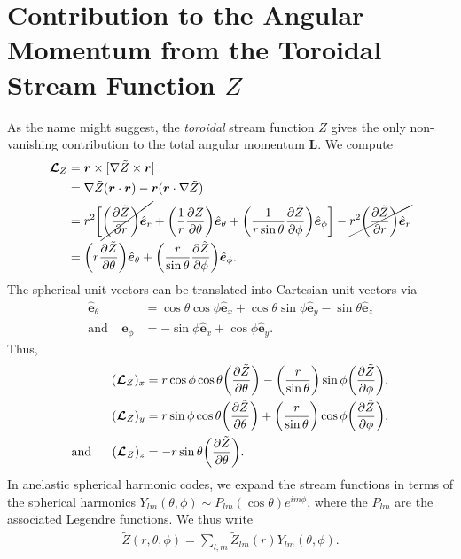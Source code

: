 \documentclass[12pt]{article} %
\newcommand{\pderiv}[2]{\frac{\partial#1}{\partial#2}}
\newcommand{\andd}{\text{and}\ \ \ \ \ }
\newcommand{\tz}{\tilde{Z}}
\newcommand{\e}{\hat{\bm{e}}}
\begin{document}
\section{Contribution to the Angular Momentum from the Toroidal Stream Function $Z$}
As the name might suggest, the \textit{toroidal} stream function $Z$ gives the only non-vanishing contribution to the total angular momentum $\bm{L}$. We compute 
\begin{align*}
\bm{\mathcal{L}}_Z &= \bm{r}\times[\nabla\tz\times\bm{r}]\\
&= \nabla\tz(\bm{r}\cdot\bm{r}) - \bm{r}(\bm{r}\cdot\nabla\tz)\\
&= r^2\bigg{[}\cancel{\bigg{(}\pderiv{\tz}{r}\bigg{)}\e_r}+\bigg{(}\frac{1}{r}\pderiv{\tz}{\theta}\bigg{)}\e_\theta + \bigg{(}\frac{1}{r\sin\theta}\pderiv{\tz}{\phi}\bigg{)}\e_\phi\bigg{]} - \cancel{r^2\bigg{(}\pderiv{\tz}{r}\bigg{)}\e_r}\\
&= \bigg{(}r\pderiv{\tz}{\theta}\bigg{)}\e_\theta + \bigg{(}\frac{r}{\sin\theta}\pderiv{\tz}{\phi}\bigg{)}\e_\phi.
\end{align*}
The spherical unit vectors can be translated into Cartesian unit vectors via
\begin{align*}
\e_\theta &= \cos\theta\cos\phi\e_x + \cos\theta\sin{\phi}\e_y - \sin\theta\e_z\\
\andd \e_\phi &= -\sin\phi\e_x + \cos\phi\e_y.
\end{align*}
Thus, 
\begin{subequations}\label{eq:lxyz}
	\begin{align}
(\bm{\mathcal{L}}_Z)_x &= r\cos\phi\cos\theta \bigg{(}\pderiv{\tz}{\theta}\bigg{)} - \bigg{(}\frac{r}{\sin\theta}\bigg{)}\sin\phi\bigg{(} \pderiv{\tz}{\phi}\bigg{)},\\
(\bm{\mathcal{L}}_Z)_y &= r\sin\phi\cos\theta \bigg{(}\pderiv{\tz}{\theta}\bigg{)} + \bigg{(}\frac{r}{\sin\theta}\bigg{)}\cos\phi\bigg{(} \pderiv{\tz}{\phi}\bigg{)},\\
\andd(\bm{\mathcal{L}}_Z)_z &= -r\sin\theta\bigg{(}\pderiv{\tz}{\theta}\bigg{)}.
\end{align}
\end{subequations}
In anelastic spherical harmonic codes, we expand the stream functions in terms of the spherical harmonics $Y_{lm}(\theta,\phi)\sim P_{lm}(\cos\theta)e^{im\phi}$, where the $P_{lm}$ are the associated Legendre functions. We thus write
\begin{align}
\tz(r,\theta,\phi) = \sum_{l,m}\tz_{lm}(r)Y_{lm}(\theta,\phi). 
\end{align}
\end{document}
